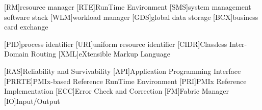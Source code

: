 [RM]{resource manager}
[RTE]{RunTime Environment}
[SMS]{system management software stack}
[WLM]{workload manager}
[GDS]{global data storage}
[BCX]{business card exchange}

[PID]{process identifier}
[URI]{uniform resource identifier}
[CIDR]{Classless Inter-Domain Routing}
[XML]{eXtensible Markup Language}

[RAS]{Reliability and Survivability}
[API]{Application Programming Interface}
[PRRTE]{PMIx-based Reference RunTime Environment}
[PRI]{PMIx Reference Implementation}
[ECC]{Error Check and Correction}
[FM]{Fabric Manager}
[IO]{Input/Output}




%
%
    

%
%
    \setcounter{page}{0}
    \setcounter{tocdepth}{2}

    \begin{spacing}{1.3}
        \tableofcontents
    \end{spacing}

%
%
    \linenumbers\pagewiselinenumbers
    \newpage{}
    \setcounter{chapter}{0}  %

%
%
    

    

    

    

